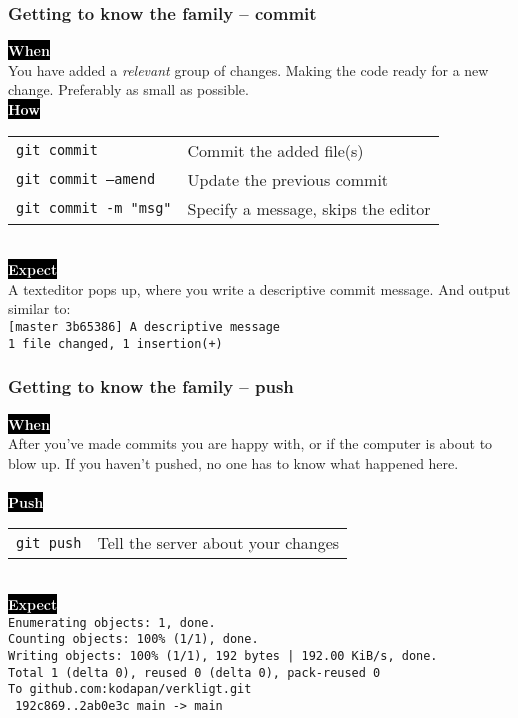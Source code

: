 \documentclass{beamer}
\newcommand{\keyword}[1]{\hspace{-1.0em}\colorbox{black}{\textcolor{white}{\textbf{#1}}}}
\begin{document}
\begin{frame}
  \frametitle{Getting to know the family -- commit}
  \keyword{When}\\
    You have added a \emph{relevant} group of changes. Making
    the code ready for a new change. Preferably as small as possible.
  \\ [0.5em]

  \keyword{How}\\
  \hspace{-1.0em}
  \begin{tabular}{ll}
    \texttt{git commit} & Commit the added file(s) \\
    \texttt{git commit --amend} & Update the previous commit \\
    \texttt{git commit -m "msg"} & Specify a message, skips the editor \\
  \end{tabular}
  \\ [0.5em]

  \keyword{Expect}\\
  A texteditor pops up, where you write a descriptive commit message. And
  output similar to: \\
  \texttt{[master 3b65386] A descriptive message} \\
  \texttt{1 file changed, 1 insertion(+)}

\end{frame}

\begin{frame}
  \frametitle{Getting to know the family -- push}
  \keyword{When}\\
    After you've made commits you are happy with, or if the computer
    is about to blow up. If you haven't pushed, no one has to know what
    happened here.\\
  \\ [0.5em]

  \keyword{Push}\\
  \hspace{-1.0em}
  \begin{tabular}{ll}
    \texttt{git push} & Tell the server about your changes \\
  \end{tabular}
  \\ [0.5em]

  \keyword{Expect}\\ [0.1em]
  \small
  \texttt{Enumerating objects: 1, done.}\\
  \texttt{Counting objects: 100\% (1/1), done.}\\
  \texttt{Writing objects: 100\% (1/1), 192 bytes | 192.00 KiB/s, done.}\\
  \texttt{Total 1 (delta 0), reused 0 (delta 0), pack-reused 0}\\
  \texttt{To github.com:kodapan/verkligt.git}\\
  \texttt{   192c869..2ab0e3c  main -> main}\\
\end{frame}
\end{document}
